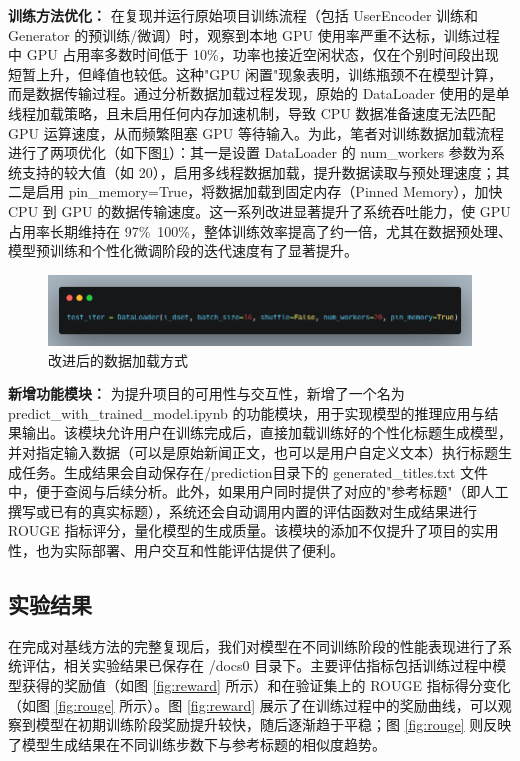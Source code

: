 \documentclass[10pt,a4paper]{article}
\begin{document}
\textbf{训练方法优化：}
在复现并运行原始项目训练流程（包括 UserEncoder 训练和 Generator 的预训练/微调）时，观察到本地 GPU 使用率严重不达标，训练过程中 GPU 占用率多数时间低于 10\%，功率也接近空闲状态，仅在个别时间段出现短暂上升，但峰值也较低。这种"GPU 闲置"现象表明，训练瓶颈不在模型计算，而是数据传输过程。通过分析数据加载过程发现，原始的 DataLoader 使用的是单线程加载策略，且未启用任何内存加速机制，导致 CPU 数据准备速度无法匹配 GPU 运算速度，从而频繁阻塞 GPU 等待输入。为此，笔者对训练数据加载流程进行了两项优化（如下图\ref{fig:data_loader}）：其一是设置 DataLoader 的 num\_workers 参数为系统支持的较大值（如 20），启用多线程数据加载，提升数据读取与预处理速度；其二是启用 pin\_memory=True，将数据加载到固定内存（Pinned Memory），加快 CPU 到 GPU 的数据传输速度。这一系列改进显著提升了系统吞吐能力，使 GPU 占用率长期维持在 97\%~100\%，整体训练效率提高了约一倍，尤其在数据预处理、模型预训练和个性化微调阶段的迭代速度有了显著提升。

\begin{figure}[H]
  \centering
  \includegraphics[width=15cm]{fig/dataloader.png}
  \caption{改进后的数据加载方式}\label{fig:data_loader}
\end{figure}


\textbf{新增功能模块：}
为提升项目的可用性与交互性，新增了一个名为 predict\_with\_trained\_model.ipynb 的功能模块，用于实现模型的推理应用与结果输出。该模块允许用户在训练完成后，直接加载训练好的个性化标题生成模型，并对指定输入数据（可以是原始新闻正文，也可以是用户自定义文本）执行标题生成任务。生成结果会自动保存在/prediction目录下的 generated\_titles.txt 文件中，便于查阅与后续分析。此外，如果用户同时提供了对应的"参考标题"（即人工撰写或已有的真实标题），系统还会自动调用内置的评估函数对生成结果进行 ROUGE 指标评分，量化模型的生成质量。该模块的添加不仅提升了项目的实用性，也为实际部署、用户交互和性能评估提供了便利。

\subsection{实验结果}
在完成对基线方法的完整复现后，我们对模型在不同训练阶段的性能表现进行了系统评估，相关实验结果已保存在 /docs0 目录下。主要评估指标包括训练过程中模型获得的奖励值（如图 \ref{fig:reward} 所示）和在验证集上的 ROUGE 指标得分变化（如图 \ref{fig:rouge} 所示）。图 \ref{fig:reward} 展示了在训练过程中的奖励曲线，可以观察到模型在初期训练阶段奖励提升较快，随后逐渐趋于平稳；图 \ref{fig:rouge} 则反映了模型生成结果在不同训练步数下与参考标题的相似度趋势。
\end{document}
